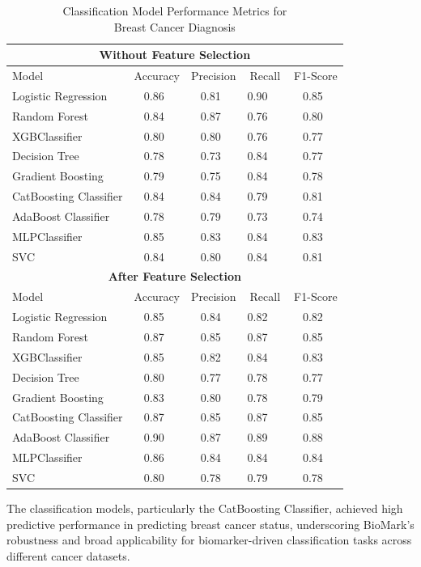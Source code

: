 \documentclass[journal]{IEEEtran}
\begin{document}
\begin{table}[h]
\centering
\caption{Classification Model Performance Metrics for \\Breast Cancer Diagnosis}
\label{tab:all_models_comparison_grouped}
\begin{tabular}{lcccc}
\toprule
\multicolumn{5}{c}{\textbf{Without Feature Selection}} \\
\midrule
Model  & Accuracy & Precision & Recall & F1-Score \\
\midrule
Logistic Regression& 0.86 & 0.81  & 0.90   & 0.85 \\
Random Forest  & 0.84 & 0.87  & 0.76   & 0.80 \\
XGBClassifier  & 0.80 & 0.80  & 0.76   & 0.77 \\
Decision Tree  & 0.78 & 0.73  & 0.84   & 0.77 \\
Gradient Boosting  & 0.79 & 0.75  & 0.84   & 0.78 \\
CatBoosting Classifier & 0.84 & 0.84  & 0.79   & 0.81 \\
AdaBoost Classifier& 0.78 & 0.79  & 0.73   & 0.74 \\
MLPClassifier  & 0.85 & 0.83  & 0.84   & 0.83 \\
SVC& 0.84 & 0.80  & 0.84   & 0.81 \\
\midrule
\multicolumn{5}{c}{\textbf{After Feature Selection}} \\
\midrule
Model  & Accuracy & Precision & Recall & F1-Score \\
\midrule
Logistic Regression& 0.85 & 0.84  & 0.82   & 0.82 \\
Random Forest  & 0.87 & 0.85  & 0.87   & 0.85 \\
XGBClassifier  & 0.85 & 0.82  & 0.84   & 0.83 \\
Decision Tree  & 0.80 & 0.77  & 0.78   & 0.77 \\
Gradient Boosting  & 0.83 & 0.80  & 0.78   & 0.79 \\
CatBoosting Classifier & 0.87 & 0.85  & 0.87   & 0.85 \\
AdaBoost Classifier& 0.90 & 0.87  & 0.89   & 0.88 \\
MLPClassifier  & 0.86 & 0.84  & 0.84   & 0.84 \\
SVC& 0.80 & 0.78  & 0.79   & 0.78 \\
\bottomrule
\end{tabular}
\end{table}

The classification models, particularly the CatBoosting Classifier, achieved high predictive performance in predicting breast cancer status, underscoring BioMark's robustness and broad applicability for biomarker-driven classification tasks across different cancer datasets.
\end{document}
